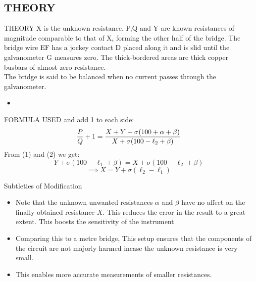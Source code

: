 \documentclass[aspectratio=169]{beamer}
\begin{document}
	\subsection{THEORY}
	\begin{frame}{THEORY}
		X is the unknown resistance. P,Q and Y are known resistances of magnitude comparable to that of X, forming the other half of the bridge. The bridge wire EF has a jockey contact D placed along it and is slid until the galvanometer G measures zero. The thick-bordered areas are thick copper busbars of almost zero resistance.\\ 
		The bridge is said to be balanced when no current passes through the galvanometer.\\ 
		\begin{itemize}
			\item
		\end{itemize}
	\end{frame}


	\begin{frame}{FORMULA USED}
		and add 1 to each side:
		\begin{equation}
			{\displaystyle {P \over Q}+1={{X+Y+\sigma (100+\alpha +\beta )} \over {X+\sigma (100-\ell _{2}+\beta )}}}
		\end{equation}
		From (1) and (2) we get:
		\begin{equation*}
			{Y+\sigma (100-\ell _{1}+\beta )=X+\sigma (100-\ell _{2}+\beta )}
		\end{equation*}
		\begin{equation}
			{\implies X= Y+ \sigma (\ell _{2}-\ell _{1})}
		\end{equation}
	\end{frame}
	\begin{frame}{Subtleties of Modification}
		\begin{itemize}
			\item Note that the unknown unwanted resistances $\alpha$ and $\beta$ have no affect on the finally obtained resistance $X$. This reduces the error in the result to a great extent.
			This boosts the sensitivity of the instrument 
			\item Comparing this to a metre bridge, This setup ensures that the components of the circuit are not majorly harmed incase the unknown resistance is very small.
			\item This enables more accurate measurements of smaller resistances.
		\end{itemize}
	\end{frame}
\end{document}
